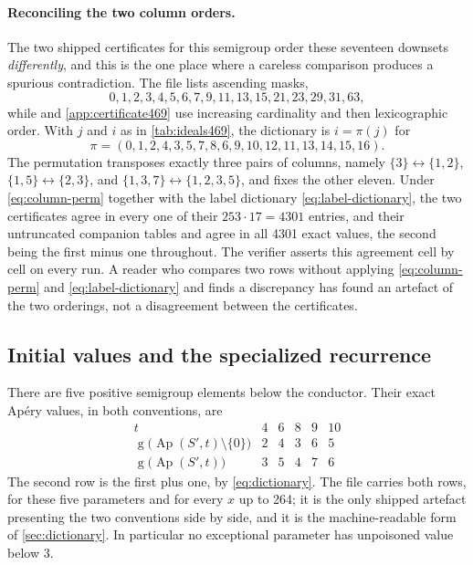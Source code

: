 \documentclass[11pt,letterpaper]{article}
\numberwithin{equation}{section}
\theoremstyle{definition}
\theoremstyle{remark}
\newcommand{\sg}{\operatorname{g}}
\newcommand{\Ap}{\operatorname{Ap}}
\begin{document}
\paragraph{Reconciling the two column orders.}
The two shipped certificates for this semigroup order these seventeen
downsets \emph{differently}, and this is the one place where a careless
comparison produces a spurious contradiction. The file
 lists ascending masks,
\begin{equation}\label{eq:masks469}
 0,1,2,3,4,5,6,7,9,11,13,15,21,23,29,31,63,
\end{equation}
while  and
\cref{app:certificate469} use increasing cardinality and then
lexicographic order. With $j$ and $i$ as in \cref{tab:ideals469}, the
dictionary is $i=\pi(j)$ for
\begin{equation}\label{eq:column-perm}
 \pi=(0,1,2,4,3,5,7,8,6,9,10,12,11,13,14,15,16).
\end{equation}
The permutation transposes exactly three pairs of columns, namely
$\{3\}\leftrightarrow\{1,2\}$, $\{1,5\}\leftrightarrow\{2,3\}$, and
$\{1,3,7\}\leftrightarrow\{1,2,3,5\}$, and fixes the other eleven. Under
\cref{eq:column-perm} together with the label dictionary
\cref{eq:label-dictionary}, the two certificates agree in every one of
their $253\cdot17=4301$ entries, and their untruncated companion tables
 and
 agree in all 4301 exact
values, the second being the first minus one throughout. The verifier
 asserts this agreement cell by
cell on every run. A reader who compares two rows without applying
\cref{eq:column-perm} and \cref{eq:label-dictionary} and finds a
discrepancy has found an artefact of the two orderings, not a
disagreement between the certificates.

\subsection{Initial values and the specialized recurrence}
\label{sec:initial469}

There are five positive semigroup elements below the conductor. Their
exact Ap\'ery values, in both conventions, are
\begin{equation}\label{eq:early469}
\begin{array}{c|rrrrr}
 t&4&6&8&9&10\\\hline
 \sg\bigl(\Ap(S',t)\setminus\{0\}\bigr)&2&4&3&6&5\\[1pt]
 \sg\bigl(\Ap(S',t)\bigr)&3&5&4&7&6
\end{array}
\end{equation}
The second row is the first plus one, by \cref{eq:dictionary}. The file
 carries both rows, for these
five parameters and for every $x$ up to 264; it is the only shipped
artefact presenting the two conventions side by side, and it is the
machine-readable form of \cref{sec:dictionary}. In particular no
exceptional parameter has unpoisoned value below 3.
\end{document}
